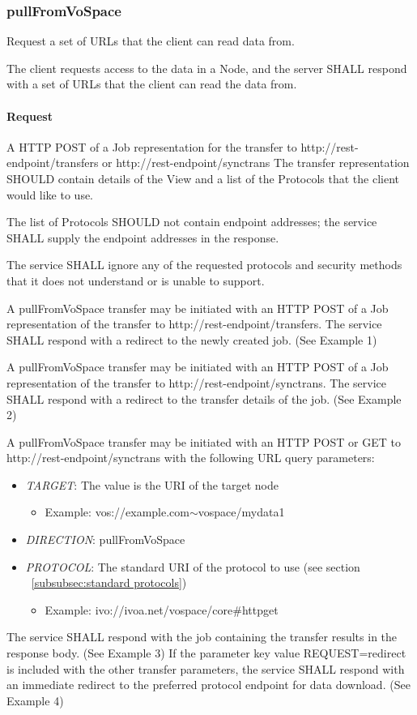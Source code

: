 \documentclass[11pt,a4paper]{ivoa}
\begin{document}
\subsubsection{pullFromVoSpace}
\label{subsubsec:pullfromvospace}
Request a set of URLs that the client can read data from.

The client requests access to the data in a Node, and the server SHALL respond with a set of URLs that the client can read the data from.

\paragraph{Request}
A HTTP POST of a Job representation for the transfer to http://rest-endpoint/transfers or http://rest-endpoint/synctrans
The transfer representation SHOULD contain details of the View and a list of the Protocols that the client would like to use.

The list of Protocols SHOULD not contain endpoint addresses; the service SHALL supply the endpoint addresses in the response.

The service SHALL ignore any of the requested protocols and security methods that it does not understand or is unable to support.

A pullFromVoSpace transfer may be initiated with an HTTP POST of a Job representation of the transfer to http://rest-endpoint/transfers. The service SHALL respond with a redirect to the newly created job.  (See Example 1)

A pullFromVoSpace transfer may be initiated with an HTTP POST of a Job representation of the transfer to http://rest-endpoint/synctrans. The service SHALL respond with a redirect to the transfer details of the job.  (See Example 2)

A pullFromVoSpace transfer may be initiated with an HTTP POST or GET to http://rest-endpoint/synctrans with the following URL query parameters:
\begin{itemize}
    \item \emph{TARGET}: The value is the URI of the target node
        \begin{itemize}
           \item Example:  vos://example.com$\mathtt{\sim}$vospace/mydata1
        \end {itemize}
    \item \emph{DIRECTION}: pullFromVoSpace
    \item \emph{PROTOCOL}: The standard URI of the protocol to use (see section ~\ref{subsubsec:standard protocols})
        \begin{itemize}
           \item Example: ivo://ivoa.net/vospace/core\#httpget
        \end {itemize}
\end{itemize}
The service SHALL respond with the job containing the transfer results in the response body.  (See Example 3)
If the parameter key value REQUEST=redirect is included with the other transfer parameters, the service SHALL respond with an immediate redirect to the preferred protocol endpoint for data download.  (See Example 4)
\end{document}
